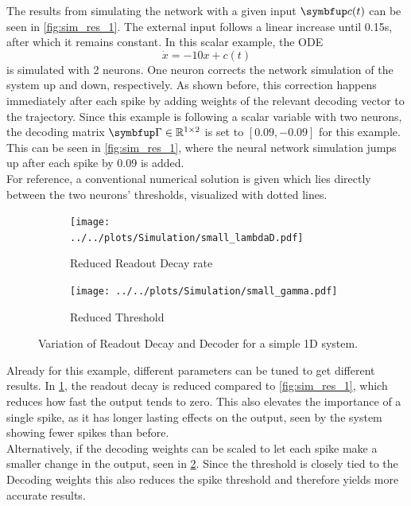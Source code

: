 The results from simulating the network with a given input $\bmu{c}(t)$ can be seen in \cref{fig:sim_res_1}. The external input follows a linear increase until 0.15s, after which it remains constant. In this scalar example, the ODE
\begin{equation}\label{eq:leaky_integration_example}
\dot{x} = -10x +c(t)
\end{equation}
is simulated with 2 neurons. One neuron corrects the network simulation of the system up and down, respectively. As shown before, this correction happens immediately after each spike by adding weights of the relevant decoding vector to the trajectory. Since this example is following a scalar variable with two neurons, the decoding matrix $\bmu{\Gamma}\in \mathbb{R}^{1\times2}$ is set to $\left[0.09,-0.09\right]$ for this example. This can be seen in \cref{fig:sim_res_1}, where the neural network simulation jumps up after each spike by 0.09 is added.\\
For reference, a conventional numerical solution is given which lies directly between the two neurons' thresholds, visualized with dotted lines.\\
\begin{figure}[h!]
	\centering
	\begin{subfigure}[t]{0.49\textwidth}
		\centering
		\texttt{[image: ../../plots/Simulation/small\_lambdaD.pdf]}
		\caption{Reduced Readout Decay rate}
		\label{fig:sim_low_lambda}
	\end{subfigure}
	\hfill
	\begin{subfigure}[t]{0.49\textwidth}
		\centering
		\texttt{[image: ../../plots/Simulation/small\_gamma.pdf]}
		\caption{Reduced Threshold}
		\label{fig:sim_low_gamma}
	\end{subfigure}
	\caption{Variation of Readout Decay and Decoder for a simple 1D system.}
	\label{fig:sim_res_2}
\end{figure}
Already for this example, different parameters can be tuned to get different results. In \cref{fig:sim_low_lambda}, the readout decay is reduced compared to \cref{fig:sim_res_1}, which reduces how fast the output tends to zero. This also elevates the importance of a single spike, as it has longer lasting effects on the output, seen by the system showing fewer spikes than before.\\
Alternatively, if the decoding weights can be scaled to let each spike make a smaller change in the output, seen in \cref{fig:sim_low_gamma}. Since the threshold is closely tied to the Decoding weights this also reduces the spike threshold and therefore yields more accurate results.


